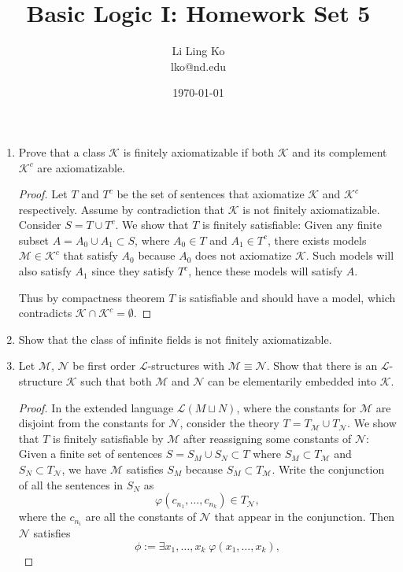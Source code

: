 \documentclass{article}
\begin{document}
\title{Basic Logic I: Homework Set 5}
\author{Li Ling Ko\\ lko@nd.edu}
\date{\today}
\maketitle

\begin{enumerate}
  \item Prove that a class $\mathcal{K}$ is finitely axiomatizable if both
    $\mathcal{K}$ and its complement $\mathcal{K}^c$ are axiomatizable.
    \begin{proof}
      Let $T$ and $T^c$ be the set of sentences that axiomatize
      $\mathcal{K}$ and $\mathcal{K}^c$ respectively. Assume by
      contradiction that $\mathcal{K}$ is not finitely axiomatizable.
      Consider $S=T\cup T^c$. We show that $T$ is finitely satisfiable:
      Given any finite subset $A=A_0\cup A_1\subset S$, where $A_0\in T$ and
      $A_1\in T^c$, there exists models $\mathcal{M}\in\mathcal{K}^c$ that
      satisfy $A_0$ because $A_0$ does not axiomatize $\mathcal{K}$. Such
      models will also satisfy $A_1$ since they satisfy $T^c$, hence these
      models will satisfy $A$.

      Thus by compactness theorem $T$ is satisfiable and should have a
      model, which contradicts $\mathcal{K}\cap\mathcal{K}^c=\emptyset$.
    \end{proof}

  \item Show that the class of infinite fields is not finitely
    axiomatizable.

  \item Let $\mathcal{M}$, $\mathcal{N}$ be first order
  $\mathcal{L}$-structures with $\mathcal{M}\equiv\mathcal{N}$. Show that
  there is an $\mathcal{L}$-structure $\mathcal{K}$ such that both
  $\mathcal{M}$ and $\mathcal{N}$ can be elementarily embedded into
  $\mathcal{K}$. 

  \begin{proof}
    In the extended language $\mathcal{L}(M\sqcup N)$, where the constants
    for $\mathcal{M}$ are disjoint from the constants for $\mathcal{N}$,
    consider the theory $T=T_\mathcal{M}\cup T_\mathcal{N}$. We show that
    $T$ is finitely satisfiable by $\mathcal{M}$ after reassigning some
    constants of $\mathcal{N}$: Given a finite set of sentences
    $S=S_M\cup S_N\subset T$ where $S_M\subset T_\mathcal{M}$ and
    $S_N\subset T_\mathcal{N}$, we have $\mathcal{M}$ satisfies $S_M$
    because $S_M\subset T_\mathcal{M}$. Write the conjunction of all the
    sentences in $S_N$ as
    \begin{equation*}
      \varphi(c_{n_1},\ldots,c_{n_k})\in T_\mathcal{N},
    \end{equation*}
    where the $c_{n_i}$ are all the constants of $\mathcal{N}$ that appear in
    the conjunction. Then $\mathcal{N}$ satisfies
    \begin{equation*}
      \phi := \exists x_1,\ldots,x_k\; \varphi(x_1,\ldots,x_k),
    \end{equation*}


\end{proof}
\end{enumerate}
\end{document}
